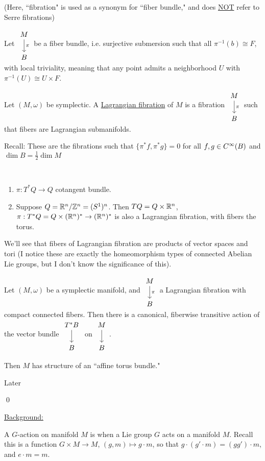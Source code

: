 \documentclass[x11names,reqno,14pt]{extarticle}
\newcommand{\pois}[2]{\{#1,#2\}}
\newcommand{\fibrate}[3]{\begin{tikzcd} #1 \ar[d, "#2"] \\ #3 \end{tikzcd}}
\begin{document}
(Here, ``fibration" is used as a synonym for ``fiber bundle," and does \underline{NOT} refer to Serre fibrations)

Let $\begin{tikzcd} M \ar[d,"\pi"] \\ B \end{tikzcd}$ be a fiber bundle, i.e. surjective submersion such that all $\pi^{-1}(b) \cong F$, with local triviality, meaning that any point admits a neighborhood $U$ with $\pi^{-1}(U) \cong U\times F$. 


Let $(M,\omega)$ be symplectic. A \underline{Lagrangian fibration} of $M$ is a fibration $\fibrate{M}{\pi}{B}$ such that fibers are Lagrangian submanifolds. 

Recall: These are the fibrations such that $\pois{\pi^*f}{\pi^*g} = 0$ for all $f, g \in C^\infty(B)$ and $\dim B = \frac12\dim M$

\exm\,
\begin{enumerate}

\item $\pi:T^*Q\to Q$ cotangent bundle.

\item Suppose $Q = \mathbb{R}^n/\mathbb{Z}^n = (S^1)^n$. Then $TQ = Q\times\mathbb{R}^n$, $\pi:T^*Q=Q\times(\mathbb{R}^n)^*\to (\mathbb{R}^n)^*$ is also a Lagrangian fibration, with fibers the torus.

\end{enumerate}

We'll see that fibers of Lagrangian fibration are products of vector spaces and tori (I notice these are exactly the homeomorphism types of connected Abelian Lie groups, but I don't know the significance of this). 

\thm

Let $(M,\omega)$ be a symplectic manifold, and $\fibrate{M}{\pi}{B}$ a Lagrangian fibration with compact connected fibers. Then there is a canonical, fiberwise transitive action of the vector bundle $\fibrate{T^*B}{}{B}$ on $\fibrate{M}{}{B}$. 

Then $M$ has structure of an ``affine torus bundle."

\proof

Later

\qed

\underline{Background:}

A $G$-action on manifold $M$ is when a Lie group $G$ acts on a manifold $M$. Recall this is a function $G\times M \to M$, $(g, m) \mapsto g\cdot m$, so that $g\cdot(g'\cdot m) = (gg')\cdot m$, and $e\cdot m = m$. 
\end{document}

